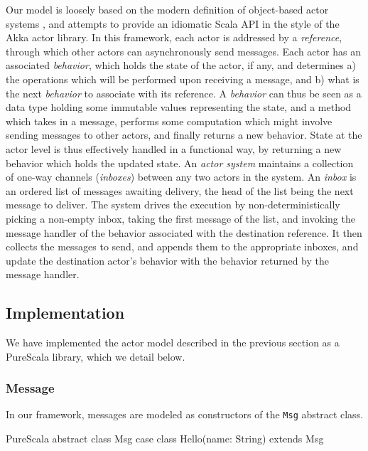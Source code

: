 \documentclass[a4paper,twoside]{article}
\newcommand{\InlineS}[1]{\lstinline[language=PureScala,basicstyle=\small\ttfamily,columns=fixed]|#1|}
\begin{document}
Our model is loosely based on the modern definition of object-based actor systems \cite{algebraicactors}, and attempts to provide an idiomatic Scala API in the style of the Akka actor library. In this framework, each actor is addressed by a \textit{reference}, through which other actors can asynchronously send messages. Each actor has an associated \textit{behavior}, which holds the state of the actor, if any, and determines a) the operations which will be performed upon receiving a message, and b) what is the next \textit{behavior} to associate with its reference. A \textit{behavior} can thus be seen as a data type holding some immutable values representing the state, and a method which takes in a message, performs some computation which might involve sending messages to other actors, and finally returns a new behavior. State at the actor level is thus effectively handled in a functional way, by returning a new behavior which holds the updated state.
An \textit{actor system} maintains a collection of one-way channels (\textit{inboxes}) between any two actors in the system. An \textit{inbox} is an ordered list of messages awaiting delivery, the head of the list being the next message to deliver. The system drives the execution by non-deterministically picking a non-empty inbox, taking the first message of the list, and invoking the message handler of the behavior associated with the destination reference. It then collects the messages to send, and appends them to the appropriate inboxes, and update the destination actor's behavior with the behavior returned by the message handler.

\clearpage

\subsection{Implementation}
\label{actor-impl}

We have implemented the actor model described in the previous section as a PureScala library, which we detail below.

\subsubsection*{Message}

In our framework, messages are modeled as constructors of the \InlineS{Msg} abstract class.

\begin{ShortCode}{PureScala}
abstract class Msg
case class Hello(name: String) extends Msg
\end{ShortCode}
\end{document}

